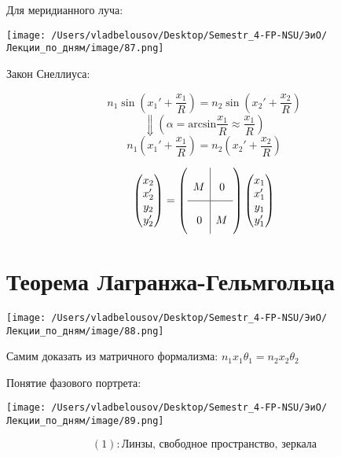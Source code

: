 \documentclass[12pt, a4paper]{report}
\begin{document}
Для меридианного луча: 

\begin{center}
    \texttt{[image: /Users/vladbelousov/Desktop/Semestr\_4-FP-NSU/ЭиО/Лекции\_по\_дням/image/87.png]}
\end{center}  
Закон Снеллиуса: 

\[ n_1 \sin \left(  x_1 ' + \frac{x_1}{R }   \right) = n_2 \sin \left( x_2 '+ \frac{x_2}{R}  \right) \] 
\[ \Downarrow {\scriptstyle \left( \alpha = \mathrm{arcsin } \frac{x_1}{R} \approx \frac{x_1}{R}   \right)} \]
\[ n_1\left( x_1' + \frac{x_1}{R}  \right)= n_2 \left( x_2' + \frac{x_2}{R}  \right)\]  

\[ \begin{pmatrix}
x_2\\
x_2 '\\
y_2\\
y_2'
\end{pmatrix}  = \left( \begin{array}{l|l} \\
    M & \text{ } 0 \\ [0.2 cm]
    \hline \\
    \text{ }0 & M \\ [0.2 cm]
\end{array} \right)
\begin{pmatrix}
    x_1\\
    x_1 '\\
    y_1\\
    y_1'
\end{pmatrix}\]


\section{Теорема Лагранжа-Гельмгольца}

\begin{center}
    \texttt{[image: /Users/vladbelousov/Desktop/Semestr\_4-FP-NSU/ЭиО/Лекции\_по\_дням/image/88.png]}
\end{center}  
Самим доказать из матричного формализма: \( n_1 x_1 \theta_1 = n_2 x_2 \theta_2  \) 

Понятие фазового портрета: 

\begin{center}
    \texttt{[image: /Users/vladbelousov/Desktop/Semestr\_4-FP-NSU/ЭиО/Лекции\_по\_дням/image/89.png]}
\end{center}  
\[ (1):\text{Линзы, свободное пространство, зеркала}  \] 
\end{document}
